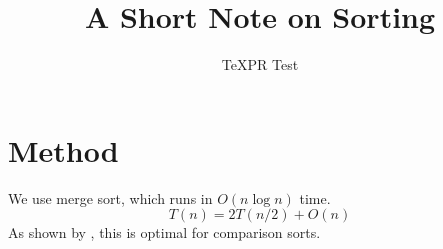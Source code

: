 \documentclass{article}
\title{A Short Note on Sorting}
\author{TeXPR Test}
\begin{document}
\maketitle

\section{Method}
We use merge sort, which runs in $O(n \log n)$ time.
\begin{equation}
  T(n) = 2T(n/2) + O(n)
\end{equation}
As shown by \cite{knuth}, this is optimal for comparison sorts.


\end{document}
